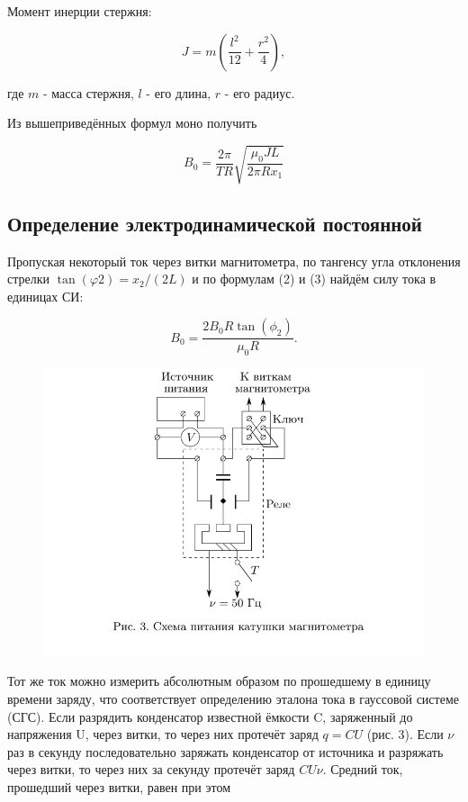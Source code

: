 \documentclass[a4paper,12pt]{article} %
\begin{document}
Момент инерции стержня:

\begin{equation}
  J = m\left(\frac{l^2}{12}+\frac{r^2}{4}\right),
\end{equation}

где $m$ - масса стержня, $l$ - его длина, $r$ - его радиус.

Из вышеприведённых формул моно получить 

\begin{equation}
  B_{0} = \frac{2\pi}{TR}\sqrt{\frac{\mu_{0}JL}{2\pi Rx_{1}}}
\end{equation}


\subsection{Определение электродинамической постоянной}

Пропуская некоторый ток через витки магнитометра, по тангенсу угла отклонения стрелки $\tan(\varphi 2) = x_{2}/(2L)$ и по формулам (2) и (3) найдём силу тока в единицах СИ:

\begin{equation}
  B_{0} = \frac{2B_{0}R\tan(\phi_2)}{\mu_{0}R}.
\end{equation}

\begin{figure}[H]
  \centering
  \includegraphics[scale=0.7]{3.png}
  \label{tc}
\end{figure}




Тот же ток можно измерить абсолютным образом по прошедшему в единицу времени заряду, что соответствует определению эталона тока в гауссовой системе (СГС). Если разрядить конденсатор известной ёмкости C, заряженный до напряжения U, через витки, то через них протечёт заряд $q = CU$ (рис. 3). Если $\nu$ раз в секунду последовательно заряжать конденсатор от источника и разряжать через витки, то через них за секунду протечёт заряд $CU\nu$. Средний ток, прошедший через витки, равен при этом
\end{document}
